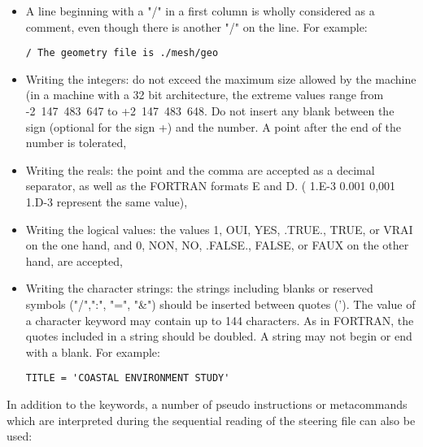 \begin{itemize}
\item A line beginning with a "/" in a first column is wholly considered as a
comment, even though there is another "/" on the line. For example:

\begin{lstlisting}[language=TelemacCas]
/ The geometry file is ./mesh/geo
\end{lstlisting}

\item Writing the integers: do not exceed the maximum size allowed by the
machine (in a machine with a 32 bit architecture, the extreme values range from
-2~147~483~647 to +2~147~483~648. Do not insert any blank between the sign
(optional for the sign +) and the number. A point after the end of the number
is tolerated,

\item Writing the reals: the point and the comma are accepted as a decimal
separator, as well as the FORTRAN formats E and D. ( 1.E-3  0.001  0,001  1.D-3
represent the same value),

\item Writing the logical values: the values 1, OUI,  YES,  .TRUE.,  TRUE,  or
VRAI on the one hand, and 0, NON,  NO,  .FALSE.,  FALSE, or FAUX on the other
hand, are accepted,

\item Writing the character strings: the strings including blanks or reserved
symbols ("/",":", "=", "\&") should be inserted between quotes ('). The value
of a character keyword may contain up to 144 characters. As in FORTRAN, the
quotes included in a string should be doubled. A string may not begin or end
with a blank. For example:

\begin{lstlisting}[language=TelemacCas]
TITLE = 'COASTAL ENVIRONMENT STUDY'
\end{lstlisting}

\end{itemize}

In addition to the keywords, a number of pseudo instructions or metacommands
which are interpreted during the sequential reading of the steering file can
also be used:

